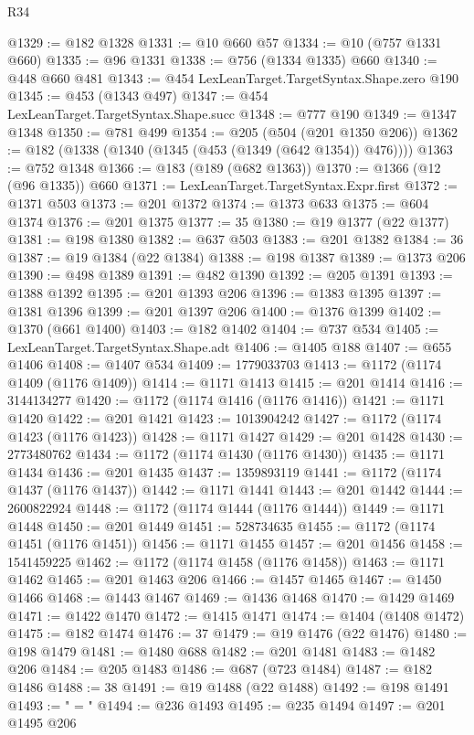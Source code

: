 \begin{lexlean}{R34}
\begin{coremodule}
@1329 := @182 @1328
@1331 := @10 @660 @57
@1334 := @10 (@757 @1331 @660)
@1335 := @96 @1331
@1338 := @756 (@1334 @1335) @660
@1340 := @448 @660 @481
@1343 := @454 LexLeanTarget.TargetSyntax.Shape.zero @190
@1345 := @453 (@1343 @497)
@1347 := @454 LexLeanTarget.TargetSyntax.Shape.succ
@1348 := @777 @190
@1349 := @1347 @1348
@1350 := @781 @499
@1354 := @205 (@504 (@201 @1350 @206))
@1362 := @182 (@1338 (@1340 (@1345 (@453 (@1349 (@642 @1354)) @476))))
@1363 := @752 @1348
@1366 := @183 (@189 (@682 @1363))
@1370 := @1366 (@12 (@96 @1335)) @660
@1371 := LexLeanTarget.TargetSyntax.Expr.first
@1372 := @1371 @503
@1373 := @201 @1372
@1374 := @1373 @633
@1375 := @604 @1374
@1376 := @201 @1375
@1377 := 35
@1380 := @19 @1377 (@22 @1377)
@1381 := @198 @1380
@1382 := @637 @503
@1383 := @201 @1382
@1384 := 36
@1387 := @19 @1384 (@22 @1384)
@1388 := @198 @1387
@1389 := @1373 @206
@1390 := @498 @1389
@1391 := @482 @1390
@1392 := @205 @1391
@1393 := @1388 @1392
@1395 := @201 @1393 @206
@1396 := @1383 @1395
@1397 := @1381 @1396
@1399 := @201 @1397 @206
@1400 := @1376 @1399
@1402 := @1370 (@661 @1400)
@1403 := @182 @1402
@1404 := @737 @534
@1405 := LexLeanTarget.TargetSyntax.Shape.adt
@1406 := @1405 @188
@1407 := @655 @1406
@1408 := @1407 @534
@1409 := 1779033703
@1413 := @1172 (@1174 @1409 (@1176 @1409))
@1414 := @1171 @1413
@1415 := @201 @1414
@1416 := 3144134277
@1420 := @1172 (@1174 @1416 (@1176 @1416))
@1421 := @1171 @1420
@1422 := @201 @1421
@1423 := 1013904242
@1427 := @1172 (@1174 @1423 (@1176 @1423))
@1428 := @1171 @1427
@1429 := @201 @1428
@1430 := 2773480762
@1434 := @1172 (@1174 @1430 (@1176 @1430))
@1435 := @1171 @1434
@1436 := @201 @1435
@1437 := 1359893119
@1441 := @1172 (@1174 @1437 (@1176 @1437))
@1442 := @1171 @1441
@1443 := @201 @1442
@1444 := 2600822924
@1448 := @1172 (@1174 @1444 (@1176 @1444))
@1449 := @1171 @1448
@1450 := @201 @1449
@1451 := 528734635
@1455 := @1172 (@1174 @1451 (@1176 @1451))
@1456 := @1171 @1455
@1457 := @201 @1456
@1458 := 1541459225
@1462 := @1172 (@1174 @1458 (@1176 @1458))
@1463 := @1171 @1462
@1465 := @201 @1463 @206
@1466 := @1457 @1465
@1467 := @1450 @1466
@1468 := @1443 @1467
@1469 := @1436 @1468
@1470 := @1429 @1469
@1471 := @1422 @1470
@1472 := @1415 @1471
@1474 := @1404 (@1408 @1472)
@1475 := @182 @1474
@1476 := 37
@1479 := @19 @1476 (@22 @1476)
@1480 := @198 @1479
@1481 := @1480 @688
@1482 := @201 @1481
@1483 := @1482 @206
@1484 := @205 @1483
@1486 := @687 (@723 @1484)
@1487 := @182 @1486
@1488 := 38
@1491 := @19 @1488 (@22 @1488)
@1492 := @198 @1491
@1493 := " = "
@1494 := @236 @1493
@1495 := @235 @1494
@1497 := @201 @1495 @206

\end{coremodule}
\end{lexlean}
